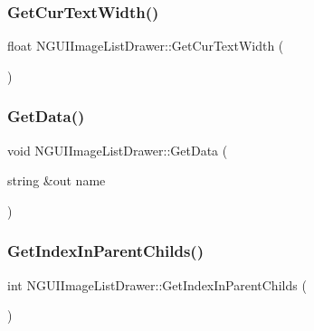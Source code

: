 \subsubsection{\texorpdfstring{Get\+Cur\+Text\+Width()}{GetCurTextWidth()}}
{\footnotesize\ttfamily float N\+G\+U\+I\+Image\+List\+Drawer\+::\+Get\+Cur\+Text\+Width (\begin{DoxyParamCaption}{ }\end{DoxyParamCaption})}

\hypertarget{class_n_g_u_i_image_list_drawer_ad1c7e7a0045ec914eec9c43db7ee02f4}{}\label{class_n_g_u_i_image_list_drawer_ad1c7e7a0045ec914eec9c43db7ee02f4} 
\subsubsection{\texorpdfstring{Get\+Data()}{GetData()}}
{\footnotesize\ttfamily void N\+G\+U\+I\+Image\+List\+Drawer\+::\+Get\+Data (\begin{DoxyParamCaption}\item[{string \&out}]{name }\end{DoxyParamCaption})}

\hypertarget{class_n_g_u_i_image_list_drawer_ab07a5322b7b69320eee4ba704f74151e}{}\label{class_n_g_u_i_image_list_drawer_ab07a5322b7b69320eee4ba704f74151e} 
\subsubsection{\texorpdfstring{Get\+Index\+In\+Parent\+Childs()}{GetIndexInParentChilds()}}
{\footnotesize\ttfamily int N\+G\+U\+I\+Image\+List\+Drawer\+::\+Get\+Index\+In\+Parent\+Childs (\begin{DoxyParamCaption}{ }\end{DoxyParamCaption})}

\hypertarget{class_n_g_u_i_image_list_drawer_ac450be52a79c4277a03f2f0b9dfa3e60}{}\label{class_n_g_u_i_image_list_drawer_ac450be52a79c4277a03f2f0b9dfa3e60} 
